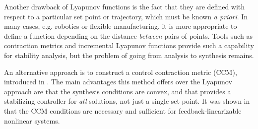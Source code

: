 \documentclass[10pt,twocolumn,twoside]{IEEEtran}
\newcounter{para}
\newcommand\mypara{\par}
\theoremstyle{plain}
\theoremstyle{definition}
\theoremstyle{remark}
\begin{document}



\mypara Another drawback of Lyapunov functions is the fact that they are defined with respect to a particular set point or trajectory, which must be known {\em a priori}. In many cases, e.g. robotics or flexible manufacturing, it is more appropriate to define a function depending on the distance {\em between} pairs of points. Tools such as contraction metrics \cite{Lohmiller1998} and incremental Lyapunov functions \cite{Angeli2002} provide such a capability for stability analysis, but the problem of going from analysis to synthesis remains.

\mypara  An alternative approach is to construct a control contraction metric (CCM), introduced in \cite{Manchester2014a, manchester_control_2017}. The main advantages this method offers over the Lyapunov approach are that the synthesis conditions are convex, and that provides a stabilizing controller for {\em all} solutions, not just a single set point. It was shown in \cite{manchester_control_2017} that the CCM conditions are necessary and sufficient for feedback-linearizable nonlinear systems.



\end{document}
